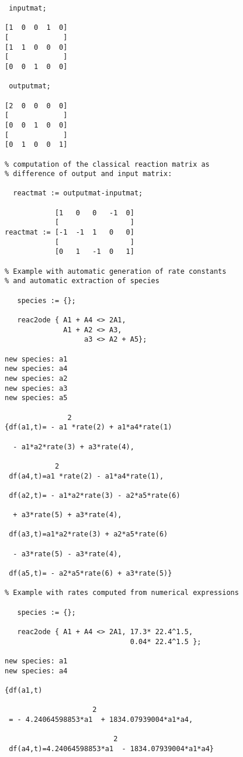 \begin{verbatim}
 inputmat;

[1  0  0  1  0]
[             ]
[1  1  0  0  0]
[             ]
[0  0  1  0  0]

 outputmat;

[2  0  0  0  0]
[             ]
[0  0  1  0  0]
[             ]
[0  1  0  0  1]

% computation of the classical reaction matrix as
% difference of output and input matrix:

  reactmat := outputmat-inputmat;

            [1   0   0   -1  0]
            [                 ]
reactmat := [-1  -1  1   0   0]
            [                 ]
            [0   1   -1  0   1]

% Example with automatic generation of rate constants
% and automatic extraction of species

   species := {};

   reac2ode { A1 + A4 <> 2A1, 
              A1 + A2 <> A3,
                   a3 <> A2 + A5};

new species: a1
new species: a4
new species: a2
new species: a3
new species: a5

               2
{df(a1,t)= - a1 *rate(2) + a1*a4*rate(1)

  - a1*a2*rate(3) + a3*rate(4),

            2
 df(a4,t)=a1 *rate(2) - a1*a4*rate(1),

 df(a2,t)= - a1*a2*rate(3) - a2*a5*rate(6)

  + a3*rate(5) + a3*rate(4),

 df(a3,t)=a1*a2*rate(3) + a2*a5*rate(6)

  - a3*rate(5) - a3*rate(4),

 df(a5,t)= - a2*a5*rate(6) + a3*rate(5)}

% Example with rates computed from numerical expressions

   species := {};

   reac2ode { A1 + A4 <> 2A1, 17.3* 22.4^1.5,
                              0.04* 22.4^1.5 };

new species: a1
new species: a4

{df(a1,t)

                     2
 = - 4.24064598853*a1  + 1834.07939004*a1*a4,

                          2
 df(a4,t)=4.24064598853*a1  - 1834.07939004*a1*a4}

\end{verbatim}